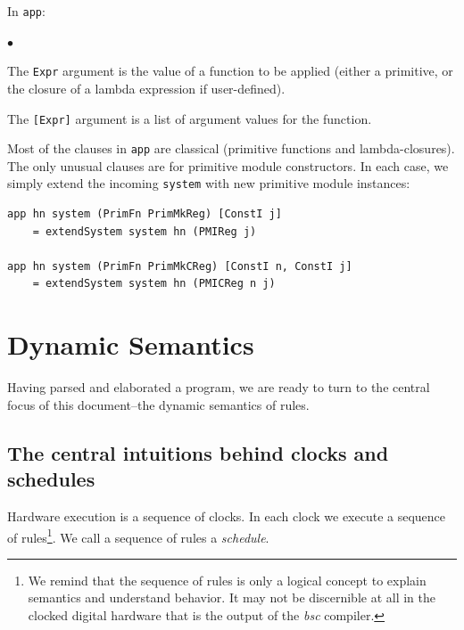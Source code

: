 \documentclass[11pt]{article}
\newenvironment{tightlist}%
{\begin{list}{$\bullet$}{%
    \setlength{\topsep}{0in}
    \setlength{\partopsep}{0in}
    \setlength{\itemsep}{0in}
    \setlength{\parsep}{0in}
    \setlength{\leftmargin}{1.5em}
    \setlength{\rightmargin}{0in}
    \setlength{\itemindent}{0in}
}
}%
{\end{list}
}
\newcommand{\term}[1]{\texttt{#1}}
\begin{document}
In \term{app}:

\begin{tightlist}

\item The \term{Expr} argument is the value of a function to be
applied (either a primitive, or the closure of a lambda expression if
user-defined).

\item The \term{[Expr]} argument is a list of argument values for the function.

\end{tightlist}

Most of the clauses in \term{app} are classical (primitive functions
and lambda-closures).  The only unusual clauses are for primitive
module constructors.  In each case, we simply extend the incoming
\term{system} with new primitive module instances:

\begin{Verbatim}[frame=single, commandchars=\\\{\}]
app hn system (PrimFn PrimMkReg) [ConstI j]
    = extendSystem system hn (PMIReg j)

app hn system (PrimFn PrimMkCReg) [ConstI n, ConstI j]
    = extendSystem system hn (PMICReg n j)
\end{Verbatim}


\section{Dynamic Semantics}

\label{sec_dynamic_semantics}

Having parsed and elaborated a program, we are ready to turn to the
central focus of this document--the dynamic semantics of rules.


\subsection{The central intuitions behind clocks and schedules}

Hardware execution is a sequence of clocks.  In each clock we execute
a sequence of rules\footnote{We remind that the sequence of rules is
only a logical concept to explain semantics and understand behavior.
It may not be discernible at all in the clocked digital hardware that
is the output of the {\it bsc} compiler.}.  We call a sequence of
rules a \emph{schedule}.
\end{document}
